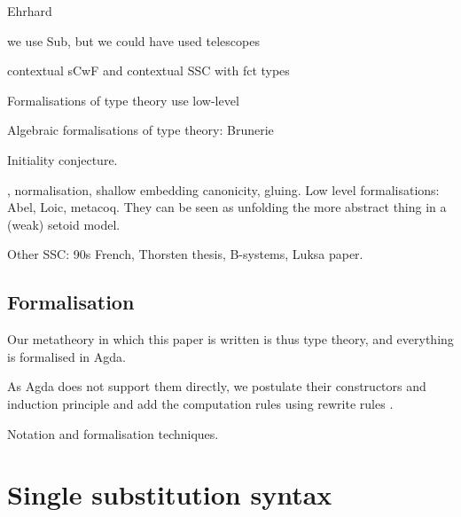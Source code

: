 \documentclass[sigplan,10pt,anonymous,review]{acmart}\settopmatter{printfolios=true,printccs=false,printacmref=false}
\begin{document}
Ehrhard

we use Sub, but we could have used telescopes

\cite{AHRENS_EMMENEGGER_NORTH_RIJKE_2023}

contextual sCwF and contextual SSC with fct types

Formalisations of type theory use low-level 

Algebraic formalisations of type theory: Brunerie

Initiality conjecture.

\cite{initiality-agda} \cite{DBLP:conf/popl/AltenkirchK16},
normalisation, shallow embedding canonicity, gluing. Low level
formalisations: Abel, Loic, metacoq. They can be seen as unfolding the
more abstract thing in a (weak) setoid model.

Other SSC: 90s French, Thorsten thesis, B-systems, Luksa paper.


\subsection{Formalisation}

Our metatheory in which this paper is
written is thus type theory, and everything is formalised in Agda.

As Agda does not support them directly, we postulate their
constructors and induction principle and add the computation rules
using rewrite rules \cite{DBLP:conf/types/Cockx19}.

Notation and formalisation techniques.

\section{Single substitution syntax}
\label{sec:ssc}
\end{document}
